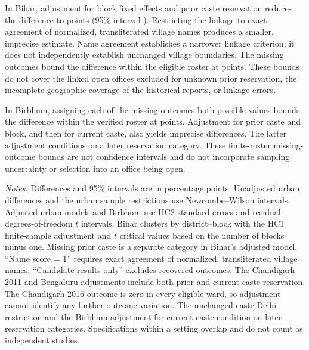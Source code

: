 In Bihar, adjustment for block fixed effects and prior caste reservation reduces the difference to \appBiharAdjusted{} points (95\% interval \appBiharAdjustedInterval{}). Restricting the linkage to exact agreement of normalized, transliterated village names produces a smaller, imprecise estimate. Name agreement establishes a narrower linkage criterion; it does not independently establish unchanged village boundaries. The \appBiharMissing{} missing outcomes bound the difference within the eligible roster at \appBiharBounds{} points. These bounds do not cover the \appBiharUnknownPrior{} linked open offices excluded for unknown prior reservation, the incomplete geographic coverage of the historical reports, or linkage errors.

In Birbhum, assigning each of the \appWbMissing{} missing outcomes both possible values bounds the difference within the verified roster at \appWbBounds{} points. Adjustment for prior caste and block, and then for current caste, also yields imprecise differences. The latter adjustment conditions on a later reservation category. These finite-roster missing-outcome bounds are not confidence intervals and do not incorporate sampling uncertainty or selection into an office being open.

\begin{table}[!htbp]
\centering
\caption{Sensitivity to adjustment and sample definition}
\label{tab:additional_sensitivity}
\footnotesize
\setlength{\tabcolsep}{3pt}

\begin{minipage}{0.96\textwidth}\small
\emph{Notes:} Differences and 95\% intervals are in percentage points. Unadjusted urban differences and the urban sample restrictions use Newcombe--Wilson intervals. Adjusted urban models and Birbhum use HC2 standard errors and residual-degrees-of-freedom $t$ intervals. Bihar clusters by district--block with the HC1 finite-sample adjustment and $t$ critical values based on the number of blocks minus one. Missing prior caste is a separate category in Bihar's adjusted model. ``Name score = 1'' requires exact agreement of normalized, transliterated village names; ``Candidate results only'' excludes recovered outcomes. The Chandigarh 2011 and Bengaluru adjustments include both prior and current caste reservation. The Chandigarh 2016 outcome is zero in every eligible ward, so adjustment cannot identify any further outcome variation. The unchanged-caste Delhi restriction and the Birbhum adjustment for current caste condition on later reservation categories. Specifications within a setting overlap and do not count as independent studies.
\end{minipage}
\end{table}
\FloatBarrier
